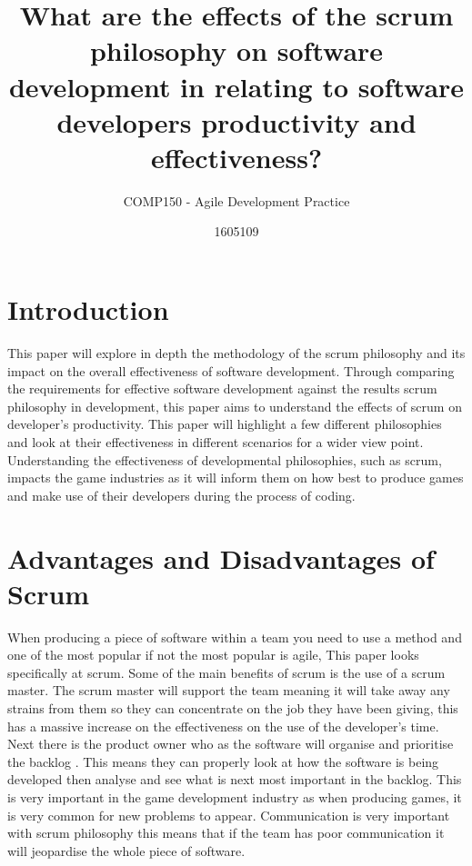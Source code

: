 \documentclass{scrartcl}
\title{What are the effects of the scrum philosophy on software development in relating to software developers productivity and effectiveness?}
\subtitle{COMP150 - Agile Development Practice}
\author{1605109}
\begin{document}
\maketitle


\section{Introduction}
This paper will explore in depth the methodology of the scrum philosophy and its impact on the overall effectiveness of software development. Through comparing the requirements for effective software development against the results scrum philosophy in development, this paper aims to understand the effects of scrum on developer’s productivity. This paper will highlight a few different philosophies and look at their effectiveness in different scenarios for a wider view point. Understanding the effectiveness of developmental philosophies, such as scrum, impacts the game industries as it will inform them on how best to produce games and make use of their developers during the process of coding.

\section{Advantages and Disadvantages of Scrum}
When producing a piece of software within a team you need to use a method and one of the most popular if not the most popular is agile, This paper looks specifically at scrum. Some of the main benefits of scrum is the use of a scrum master. The scrum master will support the team meaning it will take away any strains from them so they can concentrate on the job they have been giving, this has a massive increase on the effectiveness on the use of the developer’s time. Next there is the product owner who as the software will organise and prioritise the backlog \cite{3}. This means they can properly look at how the software is being developed then analyse and see what is next most important in the backlog. This is very important in the game development industry as when producing games, it is very common for new problems to appear. Communication is very important with scrum philosophy this means that if the team has poor communication it will jeopardise the whole piece of software.
\end{document}
